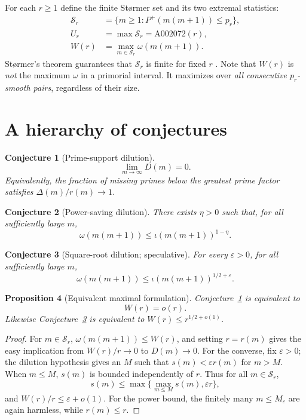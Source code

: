 \documentclass[11pt,letterpaper]{article}
\newtheorem{conjecture}{Conjecture}[section]
\newtheorem{proposition}[conjecture]{Proposition}
\theoremstyle{remark}
\newcommand{\GPF}{P^{+}}
\newcommand{\iiota}{\iota}
\newcommand{\Om}{\omega}
\begin{document}
For each $r\ge1$ define the finite St\o rmer set and its two extremal
statistics:
\begin{align*}
\mathcal S_r&=\{m\ge1:\GPF(m(m+1))\le p_r\},\\
U_r&=\max\mathcal S_r=\mathrm{A002072}(r),\\
W(r)&=\max_{m\in\mathcal S_r}\Om(m(m+1)).
\end{align*}
St\o rmer's theorem guarantees that $\mathcal S_r$ is finite for fixed $r$
\cite{Stormer,Lehmer}. Note that $W(r)$ is \emph{not} the maximum $\Om$
in a primorial interval. It maximizes over \emph{all consecutive
$p_r$-smooth pairs}, regardless of their size.

\section{A hierarchy of conjectures}
\begin{conjecture}[Prime-support dilution]\label{conj:dilution}
\[
\boxed{\displaystyle \lim_{m\to\infty}D(m)=0.}
\]
Equivalently, the fraction of missing primes below the greatest prime factor
satisfies $\Delta(m)/r(m)\to1$.
\end{conjecture}

\begin{conjecture}[Power-saving dilution]\label{conj:power}
There exists $\eta>0$ such that, for all sufficiently large $m$,
\[
\Om(m(m+1))\le \iiota(m(m+1))^{1-\eta}.
\]
\end{conjecture}

\begin{conjecture}[Square-root dilution; speculative]\label{conj:sqrt}
For every $\varepsilon>0$, for all sufficiently large $m$,
\[
\boxed{\Om(m(m+1))\le\iiota(m(m+1))^{1/2+\varepsilon}.}
\]
\end{conjecture}

\begin{proposition}[Equivalent maximal formulation]\label{prop:equiv}
Conjecture~\ref{conj:dilution} is equivalent to
\[
\boxed{W(r)=o(r).}
\]
Likewise Conjecture~\ref{conj:sqrt} is equivalent to
$W(r)\le r^{1/2+o(1)}$.
\end{proposition}
\begin{proof}
For $m\in\mathcal S_r$, $\Om(m(m+1))\le W(r)$, and setting
$r=r(m)$ gives the easy implication from $W(r)/r\to0$ to
$D(m)\to0$. For the converse, fix $\varepsilon>0$; the dilution
hypothesis gives an $M$ such that $s(m)<\varepsilon r(m)$ for $m>M$.
When $m\le M$, $s(m)$ is bounded independently of $r$. Thus for all
$m\in\mathcal S_r$,
\[
 s(m)\le\max\{\max_{m\le M}s(m),\varepsilon r\},
\]
and $W(r)/r\le\varepsilon+o(1)$. For the power bound, the finitely many
$m\le M_\varepsilon$ are again harmless, while $r(m)\le r$.
\end{proof}
\end{document}
